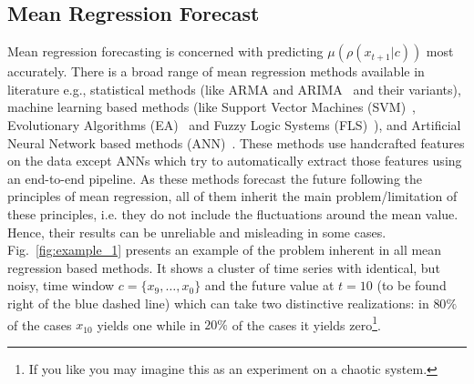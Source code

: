 \documentclass{ieeeaccess}
\begin{document}
\subsection{Mean Regression Forecast}
Mean regression forecasting is concerned with predicting $\mu(\rho(x_{t+1}|c))$ most accurately. There is a broad range of mean regression methods available in literature e.g., statistical methods (like ARMA and ARIMA~\cite{Box1990TSA574978} and their variants), machine learning based methods (like Support Vector Machines (SVM)~\cite{yan2013comparison,yan2014mid,rubio2011heuristic,vapnik1998statistical,frohlich2003feature,huang2006ga}, Evolutionary Algorithms (EA)~\cite{cortez2001genetic,frohlich2003feature,huang2006ga,gan2012hybrid,kim2000genetic,cai2013novel,bas2014modified} and Fuzzy Logic Systems (FLS)~\cite{chu1996application,song1995new,egrioglu2013fuzzy,cai2013novel,bas2014modified,shah2012fuzzy,aladag2012new}), and Artificial Neural Network based  methods (ANN)~\cite{assaad2008new,ogunmolu2016nonlinear,dorffner1996neural,malhotra2015long}. These methods use handcrafted features on the data except ANNs which try to automatically extract those features using an end-to-end pipeline. As these methods forecast the future following the principles of mean regression, all of them inherit the main problem/limitation of these principles, i.e. they do not include the fluctuations around the mean value. Hence, their results can be unreliable and misleading in some cases. Fig.~\ref{fig:example_1} presents an example of the problem inherent in all mean regression based methods. It shows a cluster of time series with identical, but noisy, time window $c=\{x_9,\ldots,x_0\}$ and the future value at $t = 10$ (to be found right of the blue dashed line) which can take two distinctive realizations: in $80\%$ of the cases $x_{10}$ yields one while in $20\%$ of the cases it yields zero\footnote{If you like you may imagine this as an experiment on a chaotic system.}.
\end{document}
